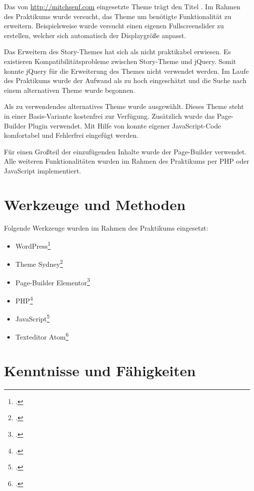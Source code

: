Das von \url{http://mitchsenf.com} eingesetzte Theme trägt den Titel . Im Rahmen des Praktikums wurde versucht, das Theme um benötigte Funktionalität zu erweitern. Beispielsweise wurde versucht einen eigenen Fullscreenslider zu erstellen, welcher sich automatisch der Displaygröße anpasst.

Das Erweitern des Story-Themes hat sich als nicht praktikabel erwiesen. Es existieren Kompatibilitätsprobleme zwischen Story-Theme und jQuery. Somit konnte jQuery für die Erweiterung des Themes nicht verwendet werden. Im Laufe des Praktikums wurde der Aufwand als zu hoch eingeschätzt und die Suche nach einem alternativen Theme wurde begonnen.

Als zu verwendendes alternatives Theme wurde  ausgewählt. Dieses Theme steht in einer Basis-Variante kostenfrei zur Verfügung. Zusätzlich wurde das Page-Builder Plugin  verwendet. Mit Hilfe von  konnte eigener JavaScript-Code komfortabel und Fehlerfrei eingefügt werden.

Für einen Großteil der einzufügenden Inhalte wurde der Page-Builder  verwendet. Alle weiteren Funktionalitäten wurden im Rahmen des Praktikums per PHP oder JavaScript implementiert.


\section{Werkzeuge und Methoden}


Folgende Werkzeuge wurden im Rahmen des Praktikums eingesetzt:

\begin{itemize}
	\item WordPress\footcite{wordpress-homepage}
	\item Theme Sydney\footcite{sydney-homepage}
	\item Page-Builder Elementor\footcite{elementor-homepage}
	\item PHP\footcite{php-homepage}
	\item JavaScript\footcite{javascript-homepage}
	\item Texteditor Atom\footcite{atom-homepage}
\end{itemize}


\section{Kenntnisse und Fähigkeiten}

